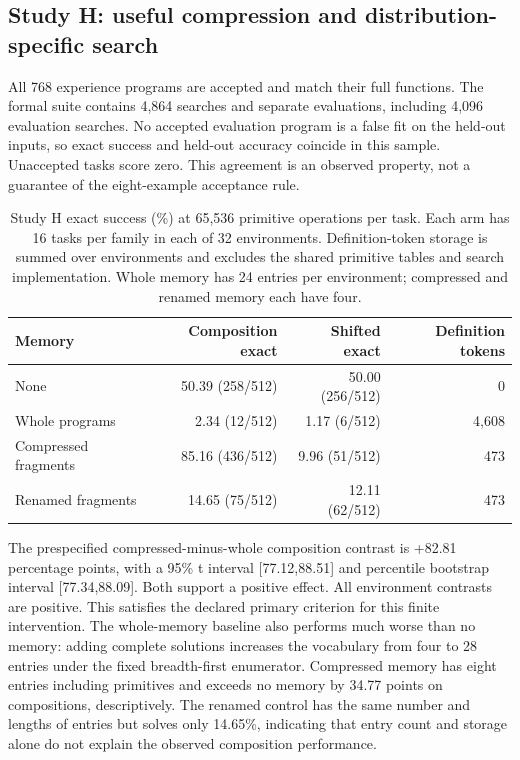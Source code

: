\documentclass[11pt]{article}
\begin{document}
\subsection{Study H: useful compression and distribution-specific search}
All 768 experience programs are accepted and match their full functions.
The formal suite contains 4,864 searches and separate evaluations, including
4,096 evaluation searches. No accepted evaluation program is a false fit on
the held-out inputs, so exact success and held-out accuracy coincide in this
sample. Unaccepted tasks score zero. This agreement is an observed property,
not a guarantee of the eight-example acceptance rule.

\begin{table}[ht]
\centering
\begin{tabular}{lrrr}
\toprule
Memory & Composition exact & Shifted exact & Definition tokens \\
\midrule
None & 50.39 (258/512) & 50.00 (256/512) & 0 \\
Whole programs & 2.34 (12/512) & 1.17 (6/512) & 4,608 \\
Compressed fragments & 85.16 (436/512) & 9.96 (51/512) & 473 \\
Renamed fragments & 14.65 (75/512) & 12.11 (62/512) & 473 \\
\bottomrule
\end{tabular}
\caption{Study H exact success (\%) at 65,536 primitive operations per task.
Each arm has 16 tasks per family in each of 32 environments. Definition-token
storage is summed over environments and excludes the shared primitive tables
and search implementation. Whole memory has 24 entries per environment;
compressed and renamed memory each have four.}
\label{tab:h}
\end{table}

The prespecified compressed-minus-whole composition contrast is +82.81
percentage points, with a 95\% t interval [77.12,88.51] and percentile
bootstrap interval [77.34,88.09]. Both support a positive effect. All environment
contrasts are positive. This satisfies the declared primary criterion for
this finite intervention. The whole-memory baseline also performs much worse
than no memory: adding complete solutions increases the vocabulary from four
to 28 entries under the fixed breadth-first enumerator. Compressed memory
has eight entries including primitives and exceeds no memory by 34.77 points
on compositions, descriptively. The renamed control has the same number and
lengths of entries but solves only 14.65\%, indicating that entry count and
storage alone do not explain the observed composition performance.
\end{document}

